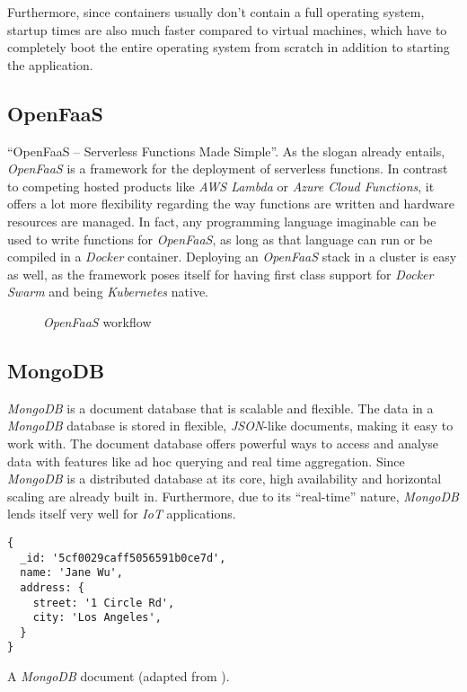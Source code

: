 Furthermore, since containers usually don't contain a full operating system, startup times are also
much faster compared to virtual machines, which have to completely boot the entire operating system
from scratch in addition to starting the application. \cite{docker-container}

\subsection{OpenFaaS}

“OpenFaaS – Serverless Functions Made Simple”. As the slogan already entails, \textit{OpenFaaS} is a
framework for the deployment of serverless functions. In contrast to competing hosted products like
\textit{AWS Lambda} or \textit{Azure Cloud Functions}, it offers a lot more flexibility regarding
the way functions are written and hardware resources are managed. In fact, any programming language
imaginable can be used to write functions for \textit{OpenFaaS}, as long as that language can run or
be compiled in a \textit{Docker} container. Deploying an \textit{OpenFaaS} stack in a cluster is
easy as well, as the framework poses itself for having first class support for \textit{Docker Swarm}
and being \textit{Kubernetes} native. \cite{openfaas-docs}

\begin{figure}[H]
  \centering
  \caption{\textit{OpenFaaS} workflow \cite{openfaas-docs}}
\end{figure}

\subsection{MongoDB}

\textit{MongoDB} is a document database that is scalable and flexible. The data in a
\textit{MongoDB} database is stored in flexible, \textit{JSON}-like documents, making it easy to
work with. The document database offers powerful ways to access and analyse data with features like
ad hoc querying and real time aggregation. Since \textit{MongoDB} is a distributed database at its
core, high availability and horizontal scaling are already built in. Furthermore, due to its
“real-time” nature, \textit{MongoDB} lends itself very well for \textit{IoT} applications.
\cite{mongodb-description}

\begin{code}[H]
  \centering
  \begin{lstlisting}[basicstyle=\small]
{
  _id: '5cf0029caff5056591b0ce7d',
  name: 'Jane Wu',
  address: {
    street: '1 Circle Rd',
    city: 'Los Angeles',
  }
}
  \end{lstlisting}
  \caption{A \textit{MongoDB} document (adapted from \cite{mongodb-description}).}
\end{code}

